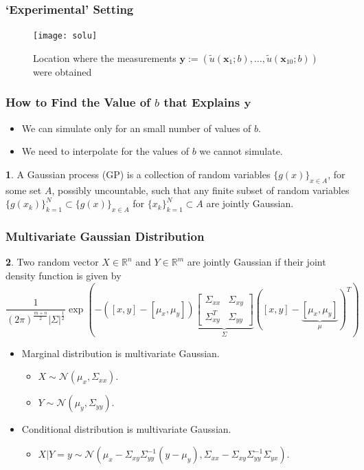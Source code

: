 \documentclass[11pt]{beamer}
\theoremstyle{plain}
\theoremstyle{definition}
\newtheorem{dfn}{}[section]
\newcommand{\y}{\textbf{y}}
\newcommand{\x}{\textbf{x}}
\begin{document}
\begin{frame}
\frametitle{`Experimental' Setting}
\begin{figure}
\texttt{[image: solu]}
\caption{Location where the measurements 
$\textbf{y}:=(\tilde{u}(\x_{1};b),\ldots,\tilde{u}(\x_{10};b))$ were obtained}
\end{figure}
\end{frame}


\begin{frame}
\frametitle{How to Find the Value of  $b$ that Explains $\y$}
\begin{itemize}
\item We can simulate only for an small number of values of $b$.
\item We need to interpolate for the values of $b$ we cannot simulate.
\end{itemize}
\begin{dfn} 
A Gaussian process (GP) is a collection of random variables $\{g(x)\}_{x\in A}$, for some set $A$,
possibly uncountable,
 such that any finite subset of random variables
 $\{g(x_{k})\}_{k=1}^{N}\subset\{g(x)\}_{x\in A}$ for
$\{x_{k}\}_{k=1}^{N}\subset A$ are jointly Gaussian.
\end{dfn}
\end{frame}

\begin{frame}
\frametitle{Multivariate Gaussian Distribution}
\begin{dfn}
Two random vector $X\in\mathbb{R}^{n}$ and $Y\in\mathbb{R}^{m}$
are jointly Gaussian if their joint density function is given by
\begin{equation*}
\frac{1}{(2\pi)^{\frac{m+n}{2}}|\Sigma|^{\frac{1}{2}}}
\exp(-([x,y]-[\mu_{x},\mu_{y}])
\underbrace{\begin{bmatrix}
\Sigma_{xx} & \Sigma_{xy}\\
\Sigma_{xy}^{T} & \Sigma_{yy}
\end{bmatrix}}_{\Sigma}
([x,y]-\underbrace{[\mu_{x},\mu_{y}]}_{\mu})^{T})
\end{equation*}
\end{dfn}
\begin{itemize}
\item Marginal distribution is multivariate Gaussian.
	\begin{itemize}
		\item $X\sim\mathcal{N}(\mu_{x},\Sigma_{xx})$.
		\item $Y\sim\mathcal{N}(\mu_{y},\Sigma_{yy})$.
	\end{itemize}
\item Conditional distribution is multivariate Gaussian.
	\begin{itemize}
		\item $X|Y=y\sim\mathcal{N}(\mu_{x}-\Sigma_{xy}\Sigma_{yy}^{-1}
		(y-\mu_{y}),\Sigma_{xx}-\Sigma_{xy}\Sigma_{yy}^{-1}\Sigma_{yx})$.
	\end{itemize}
\end{itemize}
\end{frame}
\end{document}
